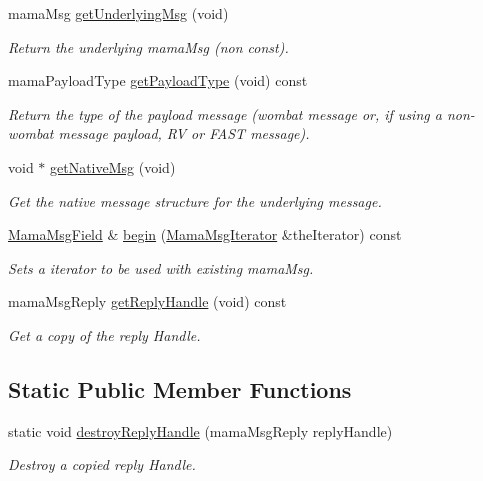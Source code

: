 \begin{DoxyCompactItemize}
mamaMsg \hyperlink{classWombat_1_1MamaMsg_a2669715e4dfbb437608dafed3f90875f}{getUnderlyingMsg} (void)
\begin{DoxyCompactList}\small\item\em Return the underlying mamaMsg (non const). \item\end{DoxyCompactList}\item 
mamaPayloadType \hyperlink{classWombat_1_1MamaMsg_a9b4b186a1b2e75f8a7a15661167e8d7e}{getPayloadType} (void) const 
\begin{DoxyCompactList}\small\item\em Return the type of the payload message (wombat message or, if using a non-\/wombat message payload, RV or FAST message). \item\end{DoxyCompactList}\item 
void $\ast$ \hyperlink{classWombat_1_1MamaMsg_adebf4f1745058281c115046cd3ba06b6}{getNativeMsg} (void)
\begin{DoxyCompactList}\small\item\em Get the native message structure for the underlying message. \item\end{DoxyCompactList}\item 
\hyperlink{classWombat_1_1MamaMsgField}{MamaMsgField} \& \hyperlink{classWombat_1_1MamaMsg_a9857b65d95f630a676166fc72dd0f156}{begin} (\hyperlink{classWombat_1_1MamaMsgIterator}{MamaMsgIterator} \&theIterator) const 
\begin{DoxyCompactList}\small\item\em Sets a iterator to be used with existing mamaMsg. \item\end{DoxyCompactList}\item 
mamaMsgReply \hyperlink{classWombat_1_1MamaMsg_a27a619720f5b52b966239d02cabf63b0}{getReplyHandle} (void) const 
\begin{DoxyCompactList}\small\item\em Get a copy of the reply Handle. \item\end{DoxyCompactList}\end{DoxyCompactItemize}
\subsection*{Static Public Member Functions}
\begin{DoxyCompactItemize}
\item 
static void \hyperlink{classWombat_1_1MamaMsg_ae57b68a19d23621e6fb7fc71c2f006cf}{destroyReplyHandle} (mamaMsgReply replyHandle)
\begin{DoxyCompactList}\small\item\em Destroy a copied reply Handle. \item\end{DoxyCompactList}\end{DoxyCompactItemize}


